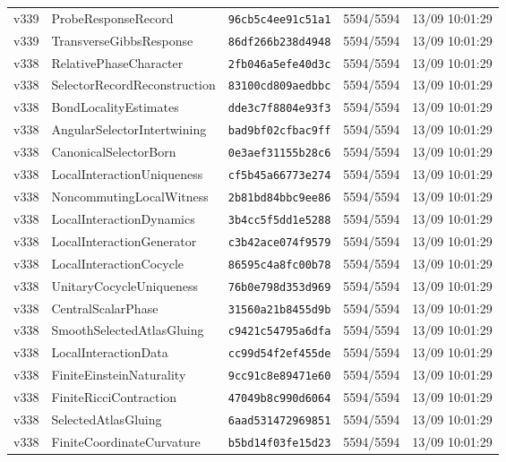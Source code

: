 \documentclass[11pt]{article}
\theoremstyle{definition}\newtheorem{deriv}{Derivation}
\begin{document}
{\begin{longtable}{@{}lllll@{}}
v339 & ProbeResponseRecord & \texttt{96cb5c4ee91c51a1} & 5594/5594 & 13/09 10:01:29 \\
v339 & TransverseGibbsResponse & \texttt{86df266b238d4948} & 5594/5594 & 13/09 10:01:29 \\
v338 & RelativePhaseCharacter & \texttt{2fb046a5efe40d3c} & 5594/5594 & 13/09 10:01:29 \\
v338 & SelectorRecordReconstruction & \texttt{83100cd809aedbbc} & 5594/5594 & 13/09 10:01:29 \\
v338 & BondLocalityEstimates & \texttt{dde3c7f8804e93f3} & 5594/5594 & 13/09 10:01:29 \\
v338 & AngularSelectorIntertwining & \texttt{bad9bf02cfbac9ff} & 5594/5594 & 13/09 10:01:29 \\
v338 & CanonicalSelectorBorn & \texttt{0e3aef31155b28c6} & 5594/5594 & 13/09 10:01:29 \\
v338 & LocalInteractionUniqueness & \texttt{cf5b45a66773e274} & 5594/5594 & 13/09 10:01:29 \\
v338 & NoncommutingLocalWitness & \texttt{2b81bd84bbc9ee86} & 5594/5594 & 13/09 10:01:29 \\
v338 & LocalInteractionDynamics & \texttt{3b4cc5f5dd1e5288} & 5594/5594 & 13/09 10:01:29 \\
v338 & LocalInteractionGenerator & \texttt{c3b42ace074f9579} & 5594/5594 & 13/09 10:01:29 \\
v338 & LocalInteractionCocycle & \texttt{86595c4a8fc00b78} & 5594/5594 & 13/09 10:01:29 \\
v338 & UnitaryCocycleUniqueness & \texttt{76b0e798d353d969} & 5594/5594 & 13/09 10:01:29 \\
v338 & CentralScalarPhase & \texttt{31560a21b8455d9b} & 5594/5594 & 13/09 10:01:29 \\
v338 & SmoothSelectedAtlasGluing & \texttt{c9421c54795a6dfa} & 5594/5594 & 13/09 10:01:29 \\
v338 & LocalInteractionData & \texttt{cc99d54f2ef455de} & 5594/5594 & 13/09 10:01:29 \\
v338 & FiniteEinsteinNaturality & \texttt{9cc91c8e89471e60} & 5594/5594 & 13/09 10:01:29 \\
v338 & FiniteRicciContraction & \texttt{47049b8c990d6064} & 5594/5594 & 13/09 10:01:29 \\
v338 & SelectedAtlasGluing & \texttt{6aad531472969851} & 5594/5594 & 13/09 10:01:29 \\
v338 & FiniteCoordinateCurvature & \texttt{b5bd14f03fe15d23} & 5594/5594 & 13/09 10:01:29 \\

\end{longtable}}
\end{document}
